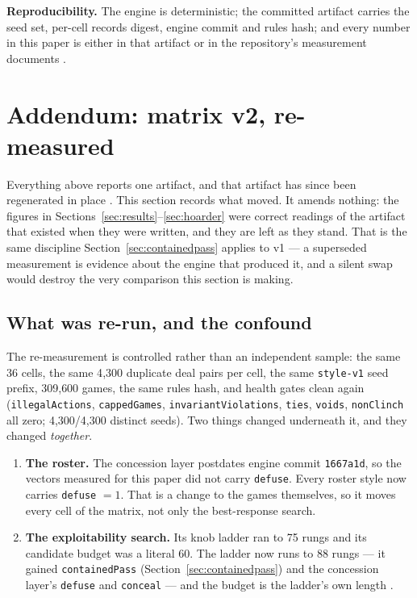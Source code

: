 \documentclass[11pt]{article}
\newcommand{\code}[1]{\texttt{#1}}
\begin{document}
\medskip
\noindent\textbf{Reproducibility.} The engine is deterministic; the committed artifact
\cite{artifact} carries the seed set, per-cell records digest, engine commit and rules hash;
and every number in this paper is either in that artifact or in the repository's measurement
documents \cite{rules,styles,botlab,containment}.

\section{Addendum: matrix v2, re-measured}
\label{sec:addendum}

Everything above reports one artifact, and that artifact has since been regenerated in place
\cite{artifactv2b}. This section records what moved. It amends nothing: the figures in
Sections~\ref{sec:results}--\ref{sec:hoarder} were correct readings of the artifact that
existed when they were written, and they are left as they stand. That is the same discipline
Section~\ref{sec:containedpass} applies to v1 --- a superseded measurement is evidence about
the engine that produced it, and a silent swap would destroy the very comparison this section
is making.

\subsection{What was re-run, and the confound}
\label{sec:addladder}

The re-measurement is controlled rather than an independent sample: the same 36 cells, the same
4{,}300 duplicate deal pairs per cell, the same \code{style-v1} seed prefix, 309{,}600 games,
the same rules hash, and health gates clean again (\code{illegalActions}, \code{cappedGames},
\code{invariantViolations}, \code{ties}, \code{voids}, \code{nonClinch} all zero;
4{,}300/4{,}300 distinct seeds). Two things changed underneath it, and they changed
\emph{together}.

\begin{enumerate}
\item \textbf{The roster.} The concession layer \cite{concession} postdates engine commit
  \code{1667a1d}, so the vectors measured for this paper did not carry \code{defuse}. Every
  roster style now carries \code{defuse} $= 1$. That is a change to the games themselves, so it
  moves every cell of the matrix, not only the best-response search.
\item \textbf{The exploitability search.} Its knob ladder ran to 75 rungs and its candidate
  budget was a literal 60. The ladder now runs to 88 rungs --- it gained \code{containedPass}
  (Section~\ref{sec:containedpass}) and the concession layer's \code{defuse} and \code{conceal}
  --- and the budget is the ladder's own length \cite{exploitladder}.
\end{enumerate}
\end{document}
